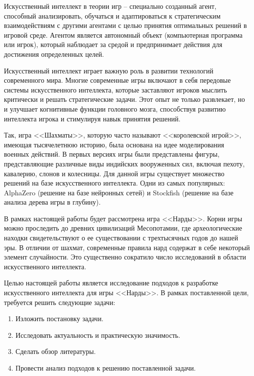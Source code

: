Искусственный интеллект в теории игр -- специально созданный агент, способный анализировать, обучаться и адаптироваться к стратегическим взаимодействиям с другими агентами с целью принятия оптимальных решений в игровой среде. Агентом является автономный объект (компьютерная программа или игрок), который наблюдает за средой и предпринимает действия для достижения определенных целей.

Искусственный интеллект играет важную роль в развитии технологий современного мира. Многие современные игры включают в себя передовые системы искусственного интеллекта, которые заставляют игроков мыслить критически и решать стратегические задачи. Этот опыт не только развлекает, но и улучшает когнитивные функции головного мозга, способствуя развитию интеллекта игрока и стимулируя навык принятия решений.

Так, игра <<Шахматы>>, которую часто называют <<королевской игрой>>, имеющая тысячелетнюю историю, была основана на идее моделирования военных действий. В первых версиях игры были представлены фигуры, представляющие различные виды индийских вооруженных сил, включая пехоту, кавалерию, слонов и колесницы. Для данной игры существует множество решений на базе искусственного интеллекта. Одни из самых популярных: AlphaZero (решение на базе нейронных сетей) и Stockfish (решение на базе анализа дерева игры в глубину).

В рамках настоящей работы будет рассмотрена игра <<Нарды>>. Корни игры можно проследить до древних цивилизаций Месопотамии, где археологические находки свидетельствуют о ее существовании с трехтысячных годов до нашей эры. В отличии от шахмат, современные правила нард содержат в себе некоторый элемент случайности. Это существенно сократило число исследований в области искусственного интеллекта.

Целью настоящей работы является исследование подходов к разработке искусственного интеллекта для игры <<Нарды>>. В рамках поставленной цели, требуется решить следующие задачи:
\begin{enumerate}
\item Изложить постановку задачи.
\item Исследовать актуальность и практическую значимость.
\item Сделать обзор литературы.
\item Провести анализ подходов к решению поставленной задачи.
\end{enumerate}
